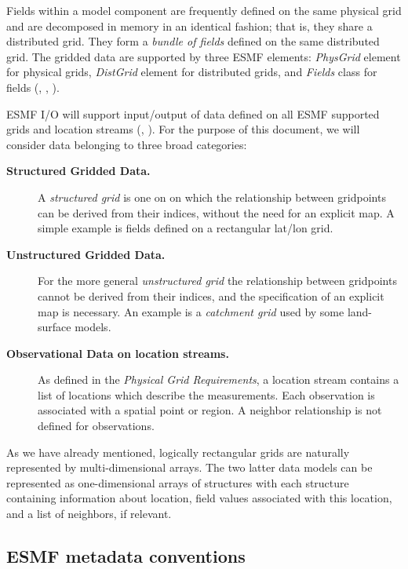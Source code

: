 Fields within a model component are frequently defined on the same
physical grid and are decomposed in memory in an identical fashion;
that is, they share a distributed grid. They form a {\em bundle of
fields} defined on the same distributed grid. The gridded data are
supported by three ESMF elements: {\em PhysGrid} element 
for physical grids, {\em DistGrid} element for distributed grids, and 
{\em Fields} class for fields (\cite{ESMF-PhysGrid-Req},
\cite{ESMF-DistGrid-Req}, \cite{ESMF-Field-Req}). 

ESMF I/O will support input/output of data defined on all ESMF
supported grids and location streams (\cite{ESMF-PhysGrid-Req},
\cite{ESMF-DistGrid-Req}). For
the purpose of this document, we will consider data belonging to three
broad categories:

\begin{description}

\item[\bf Structured Gridded Data.] A {\em structured grid} is one on 
on which the relationship between gridpoints can be derived from their
indices, without the need for an explicit map.  A simple example is fields
defined on a rectangular lat/lon grid.

\item[\bf Unstructured Gridded Data.] For the more general 
{\em unstructured grid} the relationship between gridpoints cannot be
derived from their indices, and the specification of an explicit map
is necessary.  An example is a {\em catchment grid} used by some
land-surface models.

\item[\bf Observational Data on location streams.] As defined in 
the {\em Physical Grid Requirements}, a location stream contains 
a list of locations which 
describe the measurements. Each observation is 
associated with a spatial point or region. A neighbor relationship is not 
defined for observations. 
\end{description}

As we have already mentioned, logically rectangular grids are naturally 
represented by multi-dimensional arrays. The two latter data models can be 
represented as one-dimensional arrays of structures with each structure 
containing information about location, field values associated with this 
location, and a list of neighbors, if relevant. 

\subsection{ESMF metadata conventions}

